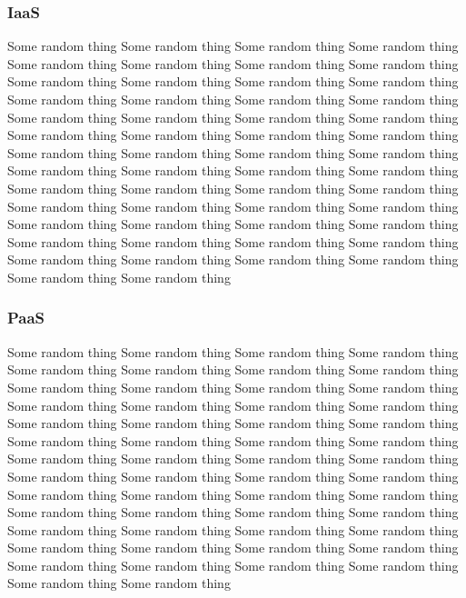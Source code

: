 \subsubsection{IaaS}
Some random thing Some random thing Some random thing Some random thing Some random thing Some random thing Some random thing Some random thing Some random thing Some random thing Some random thing Some random thing Some random thing Some random thing Some random thing Some random thing Some random thing Some random thing Some random thing Some random thing Some random thing Some random thing Some random thing Some random thing Some random thing Some random thing Some random thing Some random thing Some random thing Some random thing Some random thing Some random thing Some random thing Some random thing Some random thing Some random thing Some random thing Some random thing Some random thing Some random thing Some random thing Some random thing Some random thing Some random thing Some random thing Some random thing Some random thing Some random thing Some random thing Some random thing Some random thing Some random thing Some random thing Some random thing 


\subsubsection{PaaS}
Some random thing Some random thing Some random thing Some random thing Some random thing Some random thing Some random thing Some random thing Some random thing Some random thing Some random thing Some random thing Some random thing Some random thing Some random thing Some random thing Some random thing Some random thing Some random thing Some random thing Some random thing Some random thing Some random thing Some random thing Some random thing Some random thing Some random thing Some random thing Some random thing Some random thing Some random thing Some random thing Some random thing Some random thing Some random thing Some random thing Some random thing Some random thing Some random thing Some random thing Some random thing Some random thing Some random thing Some random thing Some random thing Some random thing Some random thing Some random thing Some random thing Some random thing Some random thing Some random thing Some random thing Some random thing 

